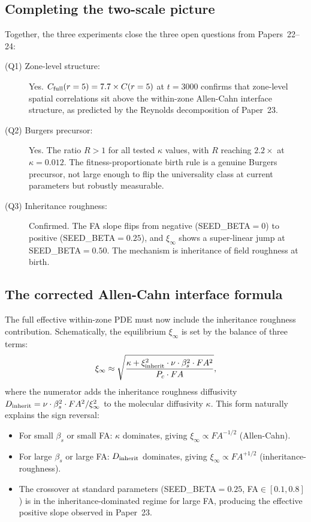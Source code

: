 \documentclass[11pt]{article}
\begin{document}
\subsection{Completing the two-scale picture}

Together, the three experiments close the three open questions from
Papers~22--24:

\begin{description}
  \item[(Q1) Zone-level structure:] Yes. $C_{\rm full}(r=5) = 7.7\times C(r=5)$
    at $t=3000$ confirms that zone-level spatial correlations sit above the
    within-zone Allen-Cahn interface structure, as predicted by the Reynolds
    decomposition of Paper~23.

  \item[(Q2) Burgers precursor:] Yes. The ratio $R > 1$ for all tested $\kappa$
    values, with $R$ reaching $2.2\times$ at $\kappa=0.012$.
    The fitness-proportionate birth rule is a genuine Burgers precursor,
    not large enough to flip the universality class at current parameters
    but robustly measurable.

  \item[(Q3) Inheritance roughness:] Confirmed. The FA slope flips from
    negative (SEED\_BETA$=0$) to positive (SEED\_BETA$=0.25$), and
    $\xi_\infty$ shows a super-linear jump at SEED\_BETA$=0.50$.
    The mechanism is inheritance of field roughness at birth.
\end{description}

\subsection{The corrected Allen-Cahn interface formula}

The full effective within-zone PDE must now include the inheritance roughness
contribution.
Schematically, the equilibrium $\xi_\infty$ is set by the balance of three terms:
\begin{equation}
  \xi_\infty \approx \sqrt{\frac{\kappa + \xi_{\rm inherit}^2 \cdot \nu \cdot \beta_s^2 \cdot FA^2}
                               {P_c \cdot FA}},
  \label{eq:xi_corrected}
\end{equation}
where the numerator adds the inheritance roughness diffusivity
$D_{\rm inherit} = \nu \cdot \beta_s^2 \cdot FA^2 / \xi_\infty^2$
to the molecular diffusivity $\kappa$.
This form naturally explains the sign reversal:
\begin{itemize}
  \item For small $\beta_s$ or small FA: $\kappa$ dominates, giving
        $\xi_\infty \propto FA^{-1/2}$ (Allen-Cahn).
  \item For large $\beta_s$ or large FA: $D_{\rm inherit}$ dominates,
        giving $\xi_\infty \propto FA^{+1/2}$ (inheritance-roughness).
  \item The crossover at standard parameters (SEED\_BETA$=0.25$, FA$\in[0.1,0.8]$)
        is in the inheritance-dominated regime for large FA, producing the
        effective positive slope observed in Paper~23.
\end{itemize}
\end{document}
